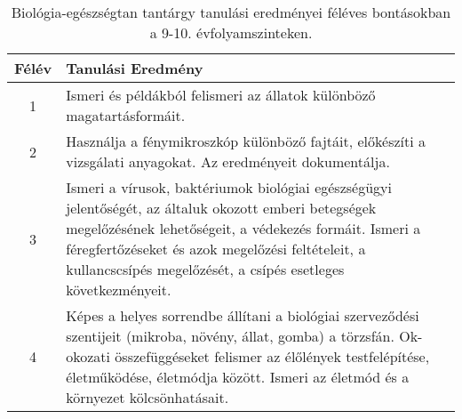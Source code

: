        
           \begin{longtable}{c | p{} }
            \caption[Biológia-egészségtan 9-10.]{Biológia-egészségtan tantárgy tanulási eredményei féléves bontásokban a 9-10. évfolyamszinteken. }  \\

            \textbf{Félév} & \textbf{Tanulási Eredmény} \\
            \hline
            \endhead
                                          1 &  Ismeri és példákból felismeri az állatok különböző magatartásformáit. \\ \hline
                                          2 &  Használja a fénymikroszkóp különböző fajtáit, előkészíti a vizsgálati anyagokat. Az eredményeit dokumentálja. \\ \hline
                                      
                                
                                          3 &  Ismeri a vírusok, baktériumok biológiai egészségügyi jelentőségét, az általuk okozott emberi betegségek megelőzésének lehetőségeit, a védekezés formáit. Ismeri a féregfertőzéseket és azok megelőzési feltételeit, a kullancscsípés megelőzését, a csípés esetleges következményeit. \\ \hline
                                          
                                      
                                
                                          4 &  Képes a helyes sorrendbe állítani a biológiai szerveződési szentijeit (mikroba, növény, állat, gomba) a törzsfán. Ok-okozati összefüggéseket felismer az élőlények testfelépítése, életműködése, életmódja között. Ismeri az életmód és a környezet kölcsönhatásait. \\ \hline
                                      
                        \end{longtable}
            \clearpage

